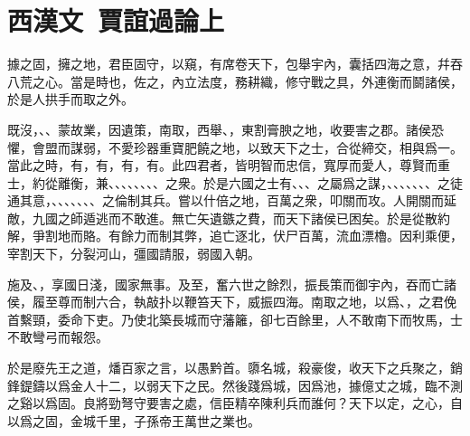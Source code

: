 \section[賈誼過秦論上\quad{\small 西漢文}]{{\normalsize 西漢文\ 賈誼}\quad 過論上}
據之固，擁之地，君臣固守，以窺，有席卷天下，包舉宇內，囊括四海之意，幷吞八荒之心。當是時也，佐之，內立法度，務耕織，修守戰之具，外連衡而鬬諸侯，於是人拱手而取之外。

既沒，、、蒙故業，因遺策，南取，西舉、，東割膏腴之地，收要害之郡。諸侯恐懼，會盟而謀弱，不愛珍器重寶肥饒之地，以致天下之士，合從締交，相與爲一。當此之時，有，有，有，有。此四君者，皆明智而忠信，寬厚而愛人，尊賢而重士，約從離衡，兼、、、、、、、、之衆。於是六國之士有、、、之屬爲之謀，、、、、、、、之徒通其意，、、、、、、、之倫制其兵。嘗以什倍之地，百萬之衆，叩關而攻。人開關而延敵，九國之師遁逃而不敢進。無亡矢遺鏃之費，而天下諸侯已困矣。於是從散約解，爭割地而賂。有餘力而制其弊，追亡逐北，伏尸百萬，流血漂櫓。因利乘便，宰割天下，分裂河山，彊國請服，弱國入朝。

施及、，享國日淺，國家無事。及至，奮六世之餘烈，振長策而御宇內，吞而亡諸侯，履至尊而制六合，執敲扑以鞭笞天下，威振四海。南取之地，以爲、，之君俛首繫頸，委命下吏。乃使北築長城而守藩籬，卻七百餘里，人不敢南下而牧馬，士不敢彎弓而報怨。

於是廢先王之道，燔百家之言，以愚黔首。隳名城，殺豪俊，收天下之兵聚之，銷鋒鍉鑄以爲金人十二，以弱天下之民。然後踐爲城，因爲池，據億丈之城，臨不測之谿以爲固。良將勁弩守要害之處，信臣精卒陳利兵而誰何？天下以定，之心，自以爲之固，金城千里，子孫帝王萬世之業也。

